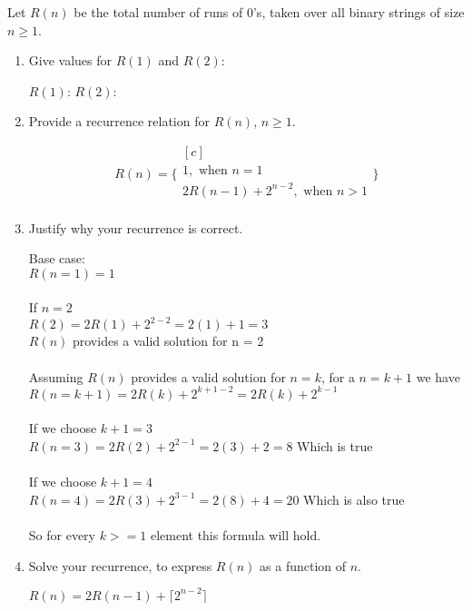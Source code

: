 \documentclass[11pt]{article}
\newcommand{\fillinblanksoln}[1]{\fillinblankmathsoln{\mbox{#1}}}
\newcommand{\fillinblankmathsoln}[1]{\begingroup\setlength{\fboxsep}{1em}\setlength{\fboxrule}{2pt}\fbox{{#1}}\endgroup}
\def\question#1{\red{#1}}
\def\soln#1{\par\blu{#1}} %
\def\blu#1{{\color{blu}#1}}
\def\red#1{{\color{red}#1}}
\begin{document}
Let $R(n)$ be the total number of runs of 0's, taken over all binary
strings of size $n \ge 1$.

\begin{enumerate}
\item \question{Give values for $R(1)$ and $R(2)$}:

\hspace{.5in}
$R(1)$: \fillinblanksoln{1}
\hspace{.5in}
$R(2)$: \fillinblanksoln{3}

\item \question{Provide a recurrence relation for $R(n)$, $n \ge 1$.}
\soln{
   \begin{equation*}
      R(n) = 
      \Bigg\{
         \begin{multlined}[c]
            \\ 1, \text{ when } n = 1 \\
            2R(n-1) + 2^{n-2}, \text{ when } n > 1 \\
         \end{multlined}
      \Bigg\}
   \end{equation*}
}

\item \question{Justify why your recurrence is correct.}
\soln{
   Base case: \\
   $R(n=1) = 1$ \\ \\
   If $n=2$ \\
   $R(2) = 2R(1) + 2^{2-2} = 2(1) + 1 = 3 $ \\ 
   $R(n)$ provides a valid solution for n = 2 \\ \\
   Assuming $R(n)$ provides a valid solution for $n=k$, for a $n=k+1$ we have \\
   $R(n=k+1) = 2R(k) + 2^{k+1-2} = 2R(k) + 2^{k-1}$ \\ \\
   If we choose $k+1=3$ \\
   $R(n=3) = 2R(2) + 2^{2-1} = 2(3) + 2 = 8$ Which is true \\ \\
   If we choose $k+1=4$ \\
   $R(n=4) = 2R(3) + 2^{3-1} = 2(8) + 4 = 20$ Which is also true\\ \\
   So for every $k >= 1$ element this formula will hold.
}

\item \question{Solve your recurrence, to express $R(n)$ as a function of $n$.}
\soln{
   $R(n) = 2R(n-1) + \lceil 2^{n-2} \rceil$
}
\end{enumerate}
\end{document}
